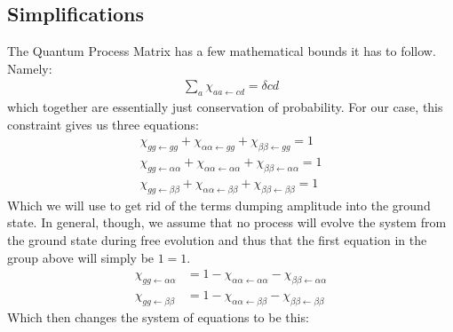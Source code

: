 \subsection{Simplifications}

The Quantum Process Matrix has a few mathematical bounds it has to follow.  Namely:
\begin{align*}
	\sum_{a} \chi_{a a \leftarrow c d} = \delta{c d}
\end{align*}
which together are essentially just conservation of probability.  For our case, this constraint gives us three equations:
\begin{align*}
	 \chi_{g g \leftarrow g g} + \chi_{\alpha \alpha \leftarrow g g} + \chi_{\beta \beta \leftarrow g g}  = 1 \\
	 \chi_{g g \leftarrow \alpha \alpha} + \chi_{\alpha \alpha \leftarrow \alpha \alpha} + \chi_{\beta \beta \leftarrow \alpha \alpha}  = 1 \\
	 \chi_{g g \leftarrow \beta \beta} + \chi_{\alpha \alpha \leftarrow \beta \beta} + \chi_{\beta \beta \leftarrow \beta \beta}  = 1
\end{align*}
Which we will use to get rid of the terms dumping amplitude into the ground state.  In general, though, we assume that no process will evolve the system from the ground state during free evolution and thus that the first equation in the group above will simply be $1=1$.
\begin{align*}
	 \chi_{g g \leftarrow \alpha \alpha}  &= 1 - \chi_{\alpha \alpha \leftarrow \alpha \alpha} - \chi_{\beta \beta \leftarrow \alpha \alpha}  \\
	 \chi_{g g \leftarrow \beta \beta} &= 1 -  \chi_{\alpha \alpha \leftarrow \beta \beta} - \chi_{\beta \beta \leftarrow \beta \beta}
\end{align*}
Which then changes the system of equations to be this:
